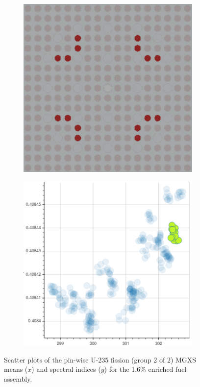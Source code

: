 \begin{figure}[h!]
\begin{subfigure}{0.42\textwidth}
  \caption{}
  \label{fig:chap10-fiss-mean-spect-ind-mgxs-2}
\end{subfigure}
\begin{subfigure}{0.42\textwidth}
  \centering
  \includegraphics[width=0.9\linewidth]{figures/unsupervised/features/assm-16/u235-fiss/mean-spect-ind/geometry-3}
  \caption{}
  \label{fig:chap10-fiss-mean-spect-ind-geom-3}
\end{subfigure}%
\begin{subfigure}{0.42\textwidth}
  \centering
  \includegraphics[width=0.9\linewidth]{figures/unsupervised/features/assm-16/u235-fiss/mean-spect-ind/mgxs-3}
  \caption{}
  \label{fig:chap10-fiss-mean-spect-ind-mgxs-3}
\end{subfigure}
\caption[Clustering of U-235 fission MGXS spectral indices]{Scatter plots of the pin-wise U-235 fission (group 2 of 2) \ac{MGXS} means ($x$) and spectral indices ($y$) for the 1.6\% enriched fuel assembly.}
\label{fig:chap10-mean-spect-ind}
\end{figure}

